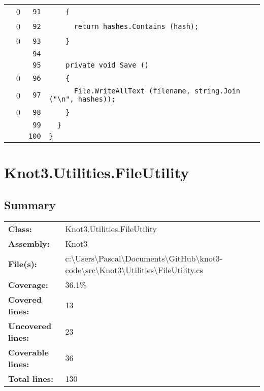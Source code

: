 \documentclass[a4paper,10pt]{article}
\begin{document}
\begin{longtable}[l]{lrrl}
\cellcolor{red} & 0 & \verb~91~ & \verb~    {~\\
\cellcolor{red} & 0 & \verb~92~ & \verb~      return hashes.Contains (hash);~\\
\cellcolor{red} & 0 & \verb~93~ & \verb~    }~\\
\cellcolor{gray} &  & \verb~94~ & \verb~~\\
\cellcolor{gray} &  & \verb~95~ & \verb~    private void Save ()~\\
\cellcolor{red} & 0 & \verb~96~ & \verb~    {~\\
\cellcolor{red} & 0 & \verb~97~ & \verb~      File.WriteAllText (filename, string.Join ("\n", hashes));~\\
\cellcolor{red} & 0 & \verb~98~ & \verb~    }~\\
\cellcolor{gray} &  & \verb~99~ & \verb~  }~\\
\cellcolor{gray} &  & \verb~100~ & \verb~}~\\
\end{longtable}
\newpage
\section{Knot3.Utilities.FileUtility}
\subsection{Summary}
\begin{longtable}[l]{ll}
\textbf{Class:} & Knot3.Utilities.FileUtility\\
\textbf{Assembly:} & Knot3\\
\textbf{File(s):} & \begin{minipage}[t]{12cm}{c:\textbackslash Users\textbackslash Pascal\textbackslash Documents\textbackslash GitHub\textbackslash knot3-code\textbackslash src\textbackslash Knot3\textbackslash Utilities\textbackslash FileUtility.cs}\end{minipage} \\
\textbf{Coverage:} & 36.1\%\\
\textbf{Covered lines:} & 13\\
\textbf{Uncovered lines:} & 23\\
\textbf{Coverable lines:} & 36\\
\textbf{Total lines:} & 130\\
\end{longtable}
\end{document}
